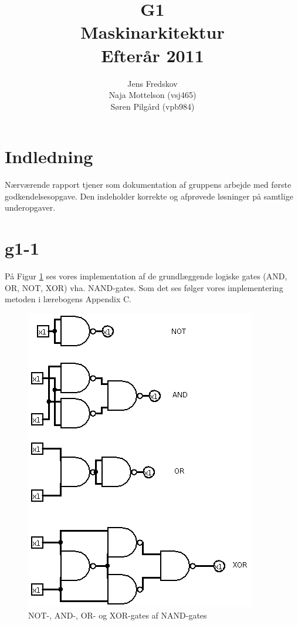 \documentclass[10pt,a4paper,danish]{article}
\title{G1\\Maskinarkitektur\\Efterår 2011}
\author{Jens Fredskov\\ Naja Mottelson (vsj465)\\Søren Pilgård (vpb984)}
\begin{document}
\maketitle
\newpage

\tableofcontents
\newpage

\section{Indledning}
Nærværende rapport tjener som dokumentation af gruppens arbejde med første
godkendelsesopgave. Den indeholder korrekte og afprøvede løsninger på samtlige
underopgaver. 

\section{g1-1}
På Figur \ref{fig:circ1} ses vores implementation af de grundlæggende logiske
gates (AND, OR, NOT, XOR) vha. NAND-gates. Som det ses følger vores implementering
metoden i lærebogens Appendix C. 

\begin{figure}[htb]
\begin{center}
\leavevmode
\includegraphics[scale=0.70]{circ1.png}
\end{center}
\caption{NOT-, AND-, OR- og XOR-gates af NAND-gates}
\label{fig:circ1} 
\end{figure}
\end{document}
